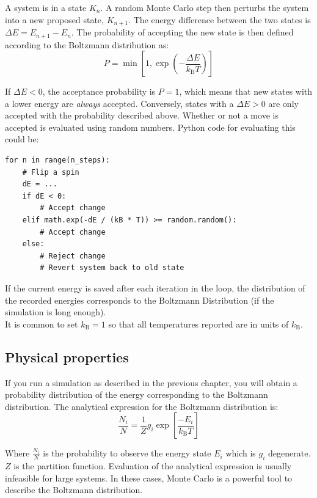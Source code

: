 \documentclass{article}
\begin{document}
A system is in a state $K_n$. A random Monte Carlo step then perturbs the system into a new
proposed state, $K_{n+1}$. The energy difference between the two states is $\Delta E = E_{n+1} - E_n$.
The probability of accepting the new state is then defined according to the Boltzmann distribution as:
\begin{equation}
P = \min \left[1, \exp \left(-\frac{\Delta E}{k_{\mathrm{B}}T}\right) \right]
\end{equation} 

If $\Delta E < 0$, the acceptance probability is $P = 1$, which means that new 
states with a lower energy are \textit{always} accepted.
Conversely, states with a $\Delta E > 0 $ are only accepted with the
probability described above. Whether or not a move is accepted is evaluated using
random numbers.
Python code for evaluating this could be:
\begin{lstlisting}
for n in range(n_steps):
    # Flip a spin
    dE = ...
    if dE < 0:
        # Accept change
    elif math.exp(-dE / (kB * T)) >= random.random():
        # Accept change
    else:
        # Reject change
        # Revert system back to old state
\end{lstlisting}

If the current energy is saved after each iteration in the loop,
the distribution of the recorded energies corresponds to the
Boltzmann Distribution (if the simulation is long enough).\\

It is common to set $k_{\mathrm{B}} = 1$ so that all
temperatures reported are in units of $k_{\mathrm{B}}$.


\newpage
\subsection{Physical properties}
If you run a simulation as described in the previous chapter, you will obtain a
probability distribution of the energy corresponding to the Boltzmann distribution.
The analytical expression for the Boltzmann distribution is:
\begin{equation}
\frac{N_i}{N} = \frac{1}{Z} g_i \exp \left[ \frac{-E_i}{k_{\mathrm{B}}T} \right]
\end{equation}

Where $\frac{N_i}{N}$ is the probability to observe the
energy state $E_i$ which is $g_i$ degenerate.
$Z$ is the partition function.
Evaluation of the analytical expression is usually infeasible for large systems.
In these cases, Monte Carlo is a powerful tool to describe the Boltzmann distribution.
\end{document}
